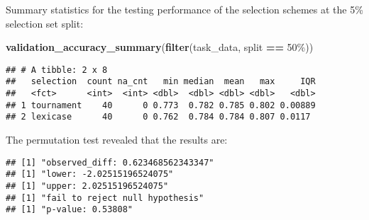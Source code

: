 \documentclass[
]{book}
\newenvironment{Shaded}{\begin{snugshade}}{\end{snugshade}}
\newcommand{\AttributeTok}[1]{\textcolor[rgb]{0.13,0.29,0.53}{#1}}
\newcommand{\DecValTok}[1]{\textcolor[rgb]{0.00,0.00,0.81}{#1}}
\newcommand{\FunctionTok}[1]{\textcolor[rgb]{0.13,0.29,0.53}{\textbf{#1}}}
\newcommand{\NormalTok}[1]{#1}
\newcommand{\OtherTok}[1]{\textcolor[rgb]{0.56,0.35,0.01}{#1}}
\newcommand{\SpecialCharTok}[1]{\textcolor[rgb]{0.81,0.36,0.00}{\textbf{#1}}}
\newcommand{\StringTok}[1]{\textcolor[rgb]{0.31,0.60,0.02}{#1}}
\begin{document}
Summary statistics for the testing performance of the selection schemes at the 5\% selection set split:

\begin{Shaded}
\begin{Highlighting}[]
\FunctionTok{validation\_accuracy\_summary}\NormalTok{(}\FunctionTok{filter}\NormalTok{(task\_data, split }\SpecialCharTok{==} \StringTok{\textquotesingle{}50\%\textquotesingle{}}\NormalTok{))}
\end{Highlighting}
\end{Shaded}

\begin{verbatim}
## # A tibble: 2 x 8
##   selection  count na_cnt   min median  mean   max     IQR
##   <fct>      <int>  <int> <dbl>  <dbl> <dbl> <dbl>   <dbl>
## 1 tournament    40      0 0.773  0.782 0.785 0.802 0.00889
## 2 lexicase      40      0 0.762  0.784 0.784 0.807 0.0117
\end{verbatim}

The permutation test revealed that the results are:

\begin{Shaded}
\end{Shaded}

\begin{verbatim}
## [1] "observed_diff: 0.623468562343347"
## [1] "lower: -2.02515196524075"
## [1] "upper: 2.02515196524075"
## [1] "fail to reject null hypothesis"
## [1] "p-value: 0.53808"
\end{verbatim}
\end{document}
